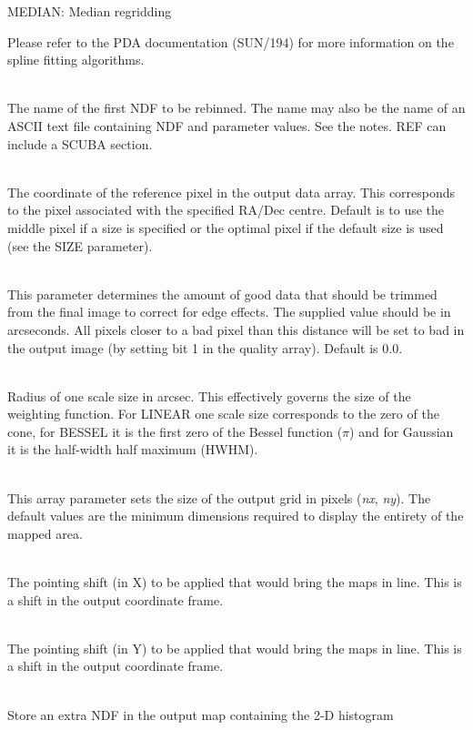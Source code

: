 \documentclass[twoside,11pt]{article}
\newcommand{\htmlref}[2]{#1}
\newcommand{\xref}[3]{#1}
\renewcommand{\_}{\texttt{\symbol{95}}}
\newcommand{\sstsubsection}[1]{ \item[{#1}] \mbox{} \\}
\newcommand{\sstitem}{\item}
\newcommand{\sstsubsection}[1]{\item[{#1}]}
\newcommand{\sstitem}{\item}
\begin{document}
{{{{            \sstitem
            MEDIAN: Median regridding
         }
         Please refer to the PDA documentation 
         (\xref{SUN/194}{sun194}{}) for more information
         on the spline fitting algorithms.
      }
      \sstsubsection{
         REF = CHAR (Read)
      }{
         The name of the first NDF to be rebinned. The name may also be the
         name of an ASCII text file containing NDF and parameter values.
         See the notes. REF can include a \htmlref{SCUBA section}{sections}.
      }
      \sstsubsection{
         REFPIX ( 2 ) = INTEGER (Read)
      }{
         The coordinate of the reference pixel in the output data
         array. This corresponds to the pixel associated with the
         specified RA/Dec centre. Default is to use the middle pixel
         if a size is specified or the optimal pixel if the default
         size is used (see the SIZE parameter).
      }
      \sstsubsection{
         TRIM = INTEGER (Read)
      }{
        This parameter determines the amount of good data that should
        be trimmed from the final image to correct for edge effects.
        The supplied value should be in arcseconds. All pixels closer
        to a bad pixel than this distance will be set to bad in the
        output image (by setting bit 1 in the quality array). 
        Default is 0.0.
      }
      \sstsubsection{
         SCALE = REAL (Read)
      }{
         Radius of one scale size in arcsec. This effectively governs the
         size of the weighting function. For LINEAR one scale size corresponds
         to the zero of the cone, for BESSEL it is the first zero of the
         Bessel function ($\pi$) and for Gaussian it is the half-width
         half maximum (HWHM).
      }
      \sstsubsection{
         SIZE ( 2 ) = INTEGER (Read)
      }{
         This array parameter sets the size of the output grid in pixels
         (\textit{nx}, \textit{ny}). The default values are the minimum
         dimensions required to display the entirety of the mapped area.
      }
      \sstsubsection{
         SHIFT\_DX = REAL (Read)
      }{
         The pointing shift (in X) to be applied that would bring the
         maps in line. This is a shift in the output coordinate frame.
      }
      \sstsubsection{
         SHIFT\_DY = REAL (Read)
      }{
         The pointing shift (in Y) to be applied that would bring the
         maps in line. This is a shift in the output coordinate frame.
      }
      \sstsubsection{
         TIMES = LOGICAL (Read)
      }{
         Store an extra NDF in the output map containing the 2-D histogram
}}}
\end{document}
